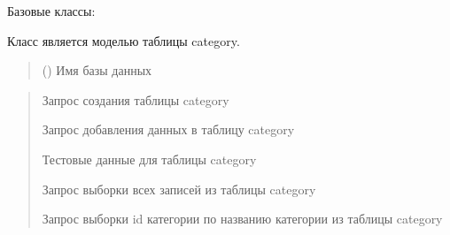 \documentclass[letterpaper,10pt,russian]{sphinxmanual}
\begin{document}
\begin{fulllineitems}
\label{\detokenize{database.sqlite3_interface.tables:database.sqlite3_interface.tables.category.Category}}
\pysigstartsignatures
{}
\pysigstopsignatures
\sphinxAtStartPar
Базовые классы: {\hyperref[\detokenize{database.sqlite3_interface.tables:database.sqlite3_interface.tables.table.Table}]{}}

\sphinxAtStartPar
Класс является моделью таблицы category.
\begin{quote}\begin{description}
\sphinxAtStartPar
{} () \textendash{} Имя базы данных

\end{description}\end{quote}
\begin{description}
\begin{quote}\begin{description}
\sphinxAtStartPar
Запрос создания таблицы category

\sphinxAtStartPar
Запрос добавления данных в таблицу category

\sphinxAtStartPar
Тестовые данные для таблицы category

\sphinxAtStartPar
Запрос выборки всех записей из таблицы category

\sphinxAtStartPar
Запрос выборки id категории по названию категории из таблицы category

\end{description}\end{quote}

\begin{sphinxVerbatim}[commandchars=\\\{\}]
\end{sphinxVerbatim}


\end{description}
\end{fulllineitems}
\end{document}
